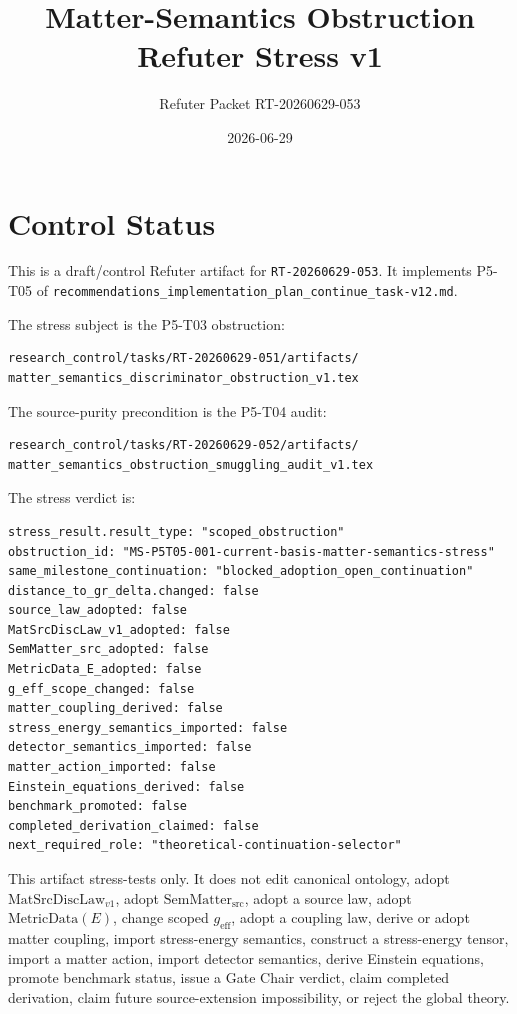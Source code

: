 \documentclass[11pt]{article}
\title{Matter-Semantics Obstruction Refuter Stress v1}
\author{Refuter Packet RT-20260629-053}
\date{2026-06-29}
\newcommand{\MetricData}{\mathrm{MetricData}}
\newcommand{\geff}{g_{\mathrm{eff}}}
\newcommand{\MatSrcDiscLaw}{\mathrm{MatSrcDiscLaw}_{v1}}
\newcommand{\SemMatterSrc}{\mathrm{SemMatter}_{\mathrm{src}}}
\begin{document}
\maketitle

\section{Control Status}

This is a draft/control Refuter artifact for \texttt{RT-20260629-053}. It
implements P5-T05 of
\texttt{recommendations\_implementation\_plan\_continue\_task-v12.md}.

The stress subject is the P5-T03 obstruction:

\begin{verbatim}
research_control/tasks/RT-20260629-051/artifacts/
matter_semantics_discriminator_obstruction_v1.tex
\end{verbatim}

The source-purity precondition is the P5-T04 audit:

\begin{verbatim}
research_control/tasks/RT-20260629-052/artifacts/
matter_semantics_obstruction_smuggling_audit_v1.tex
\end{verbatim}

The stress verdict is:

\begin{verbatim}
stress_result.result_type: "scoped_obstruction"
obstruction_id: "MS-P5T05-001-current-basis-matter-semantics-stress"
same_milestone_continuation: "blocked_adoption_open_continuation"
distance_to_gr_delta.changed: false
source_law_adopted: false
MatSrcDiscLaw_v1_adopted: false
SemMatter_src_adopted: false
MetricData_E_adopted: false
g_eff_scope_changed: false
matter_coupling_derived: false
stress_energy_semantics_imported: false
detector_semantics_imported: false
matter_action_imported: false
Einstein_equations_derived: false
benchmark_promoted: false
completed_derivation_claimed: false
next_required_role: "theoretical-continuation-selector"
\end{verbatim}

This artifact stress-tests only. It does not edit canonical ontology, adopt
\(\MatSrcDiscLaw\), adopt \(\SemMatterSrc\), adopt a source law, adopt
\(\MetricData(E)\), change scoped \(\geff\), adopt a coupling law, derive or
adopt matter coupling, import stress-energy semantics, construct a
stress-energy tensor, import a matter action, import detector semantics,
derive Einstein equations, promote benchmark status, issue a Gate Chair
verdict, claim completed derivation, claim future source-extension
impossibility, or reject the global theory.
\end{document}
